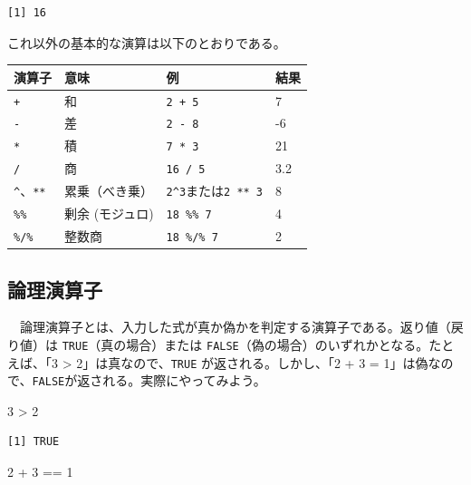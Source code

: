 \documentclass[
  a4paper,
  pandoc,
  ja=standard,
  jafont=haranoaji]{bxjsbook}
\newenvironment{Shaded}{\begin{snugshade}}{\end{snugshade}}
\newcommand{\DecValTok}[1]{\textcolor[rgb]{0.68,0.00,0.00}{#1}}
\newcommand{\SpecialCharTok}[1]{\textcolor[rgb]{0.37,0.37,0.37}{#1}}
\begin{document}
\begin{verbatim}
[1] 16
\end{verbatim}

これ以外の基本的な演算は以下のとおりである。

\begin{longtable}[]{@{}llll@{}}
\toprule
演算子 & 意味 & 例 & 結果 \\
\midrule
\endhead
\texttt{+} & 和 & \texttt{2\ +\ 5} & 7 \\
\texttt{-} & 差 & \texttt{2\ -\ 8} & -6 \\
\texttt{*} & 積 & \texttt{7\ *\ 3} & 21 \\
\texttt{/} & 商 & \texttt{16\ /\ 5} & 3.2 \\
\texttt{\^{}}、\texttt{**} & 累乗（べき乗） &
\texttt{2\^{}3}または\texttt{2\ **\ 3} & 8 \\
\texttt{\%\%} & 剰余 (モジュロ) & \texttt{18\ \%\%\ 7} & 4 \\
\texttt{\%/\%} & 整数商 & \texttt{18\ \%/\%\ 7} & 2 \\
\bottomrule
\end{longtable}

\hypertarget{ux8ad6ux7406ux6f14ux7b97ux5b50}{%
\subsection{論理演算子}\label{ux8ad6ux7406ux6f14ux7b97ux5b50}}

　論理演算子とは、入力した式が真か偽かを判定する演算子である。返り値（戻り値）は
\texttt{TRUE}（真の場合）または
\texttt{FALSE}（偽の場合）のいずれかとなる。たとえば、「3 \textgreater{}
2」は真なので、\texttt{TRUE} が返される。しかし、「2 + 3 =
1」は偽なので、\texttt{FALSE}が返される。実際にやってみよう。

\begin{Shaded}
\begin{Highlighting}[numbers=left,,]
\DecValTok{3} \SpecialCharTok{\textgreater{}} \DecValTok{2}
\end{Highlighting}
\end{Shaded}

\begin{verbatim}
[1] TRUE
\end{verbatim}

\begin{Shaded}
\begin{Highlighting}[numbers=left,,]
\DecValTok{2} \SpecialCharTok{+} \DecValTok{3} \SpecialCharTok{==} \DecValTok{1}
\end{Highlighting}
\end{Shaded}
\end{document}
